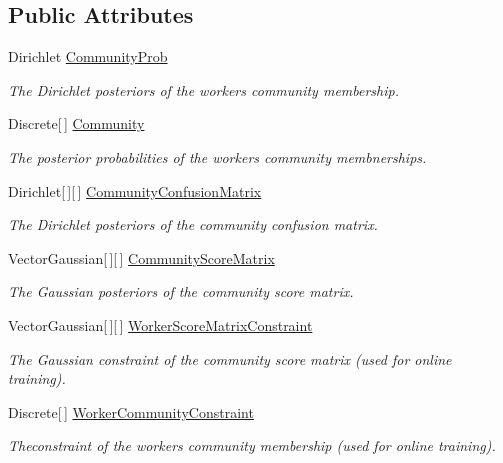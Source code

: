 \subsection*{Public Attributes}
\begin{DoxyCompactItemize}
\item 
Dirichlet \hyperlink{class_crowdsourcing_models_1_1_c_b_c_c_posteriors_a5133c813b46dc47a1eca94f718c01560}{Community\+Prob}
\begin{DoxyCompactList}\small\item\em The Dirichlet posteriors of the workers community membership. \end{DoxyCompactList}\item 
Discrete\mbox{[}$\,$\mbox{]} \hyperlink{class_crowdsourcing_models_1_1_c_b_c_c_posteriors_ae0c96f63928949598cdd0051dc97c419}{Community}
\begin{DoxyCompactList}\small\item\em The posterior probabilities of the workers community membnerships. \end{DoxyCompactList}\item 
Dirichlet\mbox{[}$\,$\mbox{]}\mbox{[}$\,$\mbox{]} \hyperlink{class_crowdsourcing_models_1_1_c_b_c_c_posteriors_a66a61bd5cab64b9ada79b2ed55cf832a}{Community\+Confusion\+Matrix}
\begin{DoxyCompactList}\small\item\em The Dirichlet posteriors of the community confusion matrix. \end{DoxyCompactList}\item 
Vector\+Gaussian\mbox{[}$\,$\mbox{]}\mbox{[}$\,$\mbox{]} \hyperlink{class_crowdsourcing_models_1_1_c_b_c_c_posteriors_ad9a3f9c06a94f221a71bfa803f4b9434}{Community\+Score\+Matrix}
\begin{DoxyCompactList}\small\item\em The Gaussian posteriors of the community score matrix. \end{DoxyCompactList}\item 
Vector\+Gaussian\mbox{[}$\,$\mbox{]}\mbox{[}$\,$\mbox{]} \hyperlink{class_crowdsourcing_models_1_1_c_b_c_c_posteriors_a28a4852598eb85d4bc635c247d761f2b}{Worker\+Score\+Matrix\+Constraint}
\begin{DoxyCompactList}\small\item\em The Gaussian constraint of the community score matrix (used for online training). \end{DoxyCompactList}\item 
Discrete\mbox{[}$\,$\mbox{]} \hyperlink{class_crowdsourcing_models_1_1_c_b_c_c_posteriors_aa72e3388283ae2e52aaa15d232f38114}{Worker\+Community\+Constraint}
\begin{DoxyCompactList}\small\item\em Theconstraint of the workers community membership (used for online training). \end{DoxyCompactList}\end{DoxyCompactItemize}


